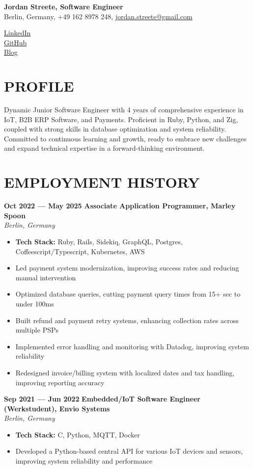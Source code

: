 \documentclass[11pt,a4paper]{article}
\newcommand{\resumesection}[1]{
  \section*{\textcolor{sectioncolor}{\MakeUppercase{#1}}}
}
\newcommand{\job}[4]{
  \textbf{#1 — #2} \hfill \textbf{#3} \\
  \textit{#4}
}
\begin{document}
\begin{minipage}[t]{0.6\textwidth}
{\LARGE\textbf{Jordan Streete, Software Engineer}}\\
Berlin, Germany, +49 162 8978 248, \href{mailto:jordan.streete+work-apps-2025@gmail.com}{jordan.streete@gmail.com}
\end{minipage}
\hfill
\begin{minipage}[t]{0.35\textwidth}
\raggedleft
\href{https://www.linkedin.com/in/jordan-streete-0b8b3711a/}{LinkedIn}\\
\href{https://github.com/BoundlessCarrot}{GitHub}\\
\href{https://jstr.dev}{Blog}
\end{minipage}

\resumesection{Profile}
Dynamic Junior Software Engineer with 4 years of comprehensive experience in IoT, B2B ERP Software, and Payments. Proficient in Ruby, Python, and Zig, coupled with strong skills in database optimization and system reliability. Committed to continuous learning and growth, ready to embrace new challenges and expand technical expertise in a forward-thinking environment.

\resumesection{Employment \hspace{0.1em} History}

\job{Oct 2022} {May 2025} {Associate Application Programmer, Marley Spoon} {Berlin, Germany}
\begin{itemize}[leftmargin=*,label=$\bullet$,itemsep=0.3ex]
    \item \textbf{Tech Stack:} Ruby, Rails, Sidekiq, GraphQL, Postgres, Coffeescript/Typescript, Kubernetes, AWS
    \item Led payment system modernization, improving success rates and reducing manual intervention
    \item Optimized database queries, cutting payment query times from 15+ sec to under 100ms
    \item Built refund and payment retry systems, enhancing collection rates across multiple PSPs
    \item Implemented error handling and monitoring with Datadog, improving system reliability
    \item Redesigned invoice/billing system with localized dates and tax handling, improving reporting accuracy
\end{itemize}
  
\job{Sep 2021} {Jun 2022} {Embedded/IoT Software Engineer (Werkstudent), Envio Systems} {Berlin, Germany}
\begin{itemize}[leftmargin=*,label=$\bullet$,itemsep=0.3ex]
    \item \textbf{Tech Stack:} C, Python, MQTT, Docker
    \item Developed a Python-based central API for various IoT devices and sensors, improving system reliability and performance
\end{itemize}
\end{document}
